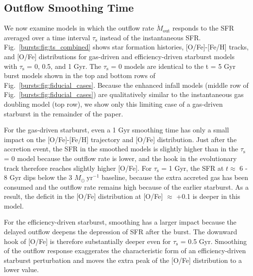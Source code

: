 \subsection{Outflow Smoothing Time}
\label{bursts:sec:smoothing}
We now examine models in which the outflow rate $\dot{M}_\text{out}$ responds 
to the SFR averaged over a time interval $\tau_\text{s}$ instead of the 
instantaneous SFR. Fig.~\ref{bursts:fig:ts_combined} shows star formation histories, 
[O/Fe]-[Fe/H] tracks, and [O/Fe] distributions for gas-driven and 
efficiency-driven starburst models with $\tau_\text{s}$ = 0, 0.5, and 1 Gyr. 
The $\tau_\text{s}$ = 0 models are identical to the t = 5 Gyr burst models 
shown in the top and bottom rows of Fig.~\ref{bursts:fig:fiducial_cases}. Because 
the enhanced infall models (middle row of Fig.~\ref{bursts:fig:fiducial_cases}) are 
qualitatively similar to the instantaneous gas doubling model (top row), we 
show only this limiting case of a gas-driven starburst in the remainder of the 
paper. 
\par 
For the gas-driven starburst, even a 1 Gyr smoothing time has only a small 
impact on the [O/Fe]-[Fe/H] trajectory and [O/Fe] distribution. Just after the 
accretion event, the SFR in the smoothed models is slightly higher than in the 
$\tau_\text{s}$ = 0 model because the outflow rate is lower, and the hook in 
the evolutionary track therefore reaches slightly higher [O/Fe]. For 
$\tau_\text{s}$ = 1 Gyr, the SFR at $t\approx$ 6 - 8 Gyr dips below the 
3 $M_\odot\ \text{yr}^{-1}$ baseline, because the extra accreted gas has been 
consumed and the outflow rate remains high because of the earlier starburst. 
As a result, the deficit in the [O/Fe] distribution at [O/Fe] $\approx$ +0.1 
is deeper in this model. 
\par 
For the efficiency-driven starburst, smoothing has a larger impact because the 
delayed outflow deepens the depression of SFR after the burst. The downward 
hook of [O/Fe] is therefore substantially deeper even for $\tau_\text{s}$ = 0.5 
Gyr. Smoothing of the outflow response exaggerates the characteristic form of 
an efficiency-driven starburst perturbation and moves the extra peak of the 
[O/Fe] distribution to a lower value. 


